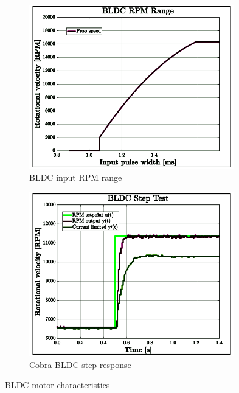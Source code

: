 \begin{figure}[hbtp]
\begin{subfigure}{0.5\textwidth}
\centering
\includegraphics[width=0.98\textwidth]{graphs/bldc-range}
\caption{BLDC input RPM range}
\label{fig:bldc-range}
\end{subfigure}
\begin{subfigure}{0.5\textwidth}
\centering
\includegraphics[width=0.98\textwidth]{graphs/BLDC-step}
\caption{Cobra BLDC step response}
\label{fig:bldc-step}
\end{subfigure}
\caption{BLDC motor characteristics}
\end{figure}
\par
